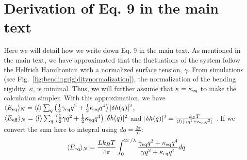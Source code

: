 \documentclass[amsmath,preprintnumbers,10pt,nofootinbib,prl,twocolumn]{revtex4-1}
\begin{document}
\section{Derivation of Eq. 9 in the main text}
Here we will detail how we write down Eq. 9 in the main text. As mentioned in the main text, we have approximated that the fluctuations of the system follow the Helfrich Hamiltonian with a normalized surface tension, $\gamma$. From simulations (see Fig.~\ref{fig:bendingrigiditynormalization}), the normalization of the bending rigidity, $\kappa$, is minimal. Thus, we will further assume that $\kappa= \kappa_{\rm eq}$ to make the calculation simpler. With this approximation, we have $\langle E_{\rm eq}\rangle _N=\langle l \rangle\sum_q\left(\frac{1}{2}\gamma_{\rm eq} q^2+\frac{1}{2}\kappa_{\rm eq} q^4\right)|\delta h(q)|^2$, $\langle E_{\rm eff}\rangle_N=\langle l \rangle\sum_q\left(\frac{1}{2}\gamma q^2+\frac{1}{2}\kappa_{\rm eq} q^4\right)|\delta h(q)|^2$ and $|\delta h(q)|^2=\frac{k_B T}{\langle l \rangle  \left(\gamma q^2+\kappa_{\rm eq}q^3\right)}$ . If we convert the sum here to integral using $dq=\frac{2\pi}{L}$:
\begin{equation}
    \langle E_{\rm eq}\rangle_N=\frac{L k_BT}{4\pi}\int_0^{2\pi/\lambda}\frac{\gamma_{\rm eq}q^2+\kappa_{\rm eq}q^4}{\gamma q^2+\kappa_{\rm eq}q^4}dq
\end{equation}
\end{document}
